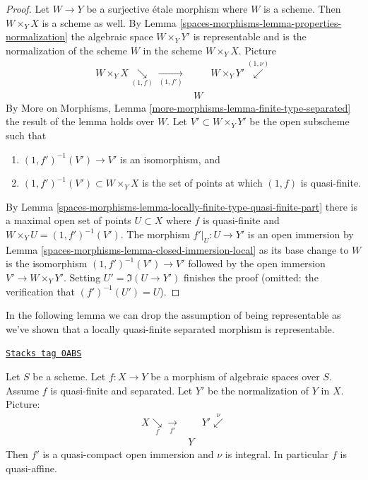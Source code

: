 \begin{proof}
Let $W \to Y$ be a surjective \'etale morphism where $W$ is a scheme.
Then $W \times_Y X$ is a scheme as well. By
Lemma \ref{spaces-morphisms-lemma-properties-normalization}
the algebraic space $W \times_Y Y'$ is representable and is
the normalization of the scheme $W$ in the scheme $W \times_Y X$. Picture
$$
\begin{array}{ccc}W \times_Y X \underset{(1, f)}{\searrow}\underset{(1, f')}{\longrightarrow} &  & W \times_Y Y' \overset{(1, \nu)}{\swarrow} \\  & W & \end{array}
$$
By More on Morphisms, Lemma \ref{more-morphisms-lemma-finite-type-separated}
the result of the lemma holds over $W$. Let $V' \subset W \times_Y Y'$
be the open subscheme such that
\begin{enumerate}
\item $(1, f')^{-1}(V') \to V'$ is an isomorphism, and
\item $(1, f')^{-1}(V') \subset W \times_Y X$ is the set of points at which
$(1, f)$ is quasi-finite.
\end{enumerate}
By Lemma \ref{spaces-morphisms-lemma-locally-finite-type-quasi-finite-part}
there is a maximal open set of points $U \subset X$ where $f$
is quasi-finite and $W \times_Y U = (1, f')^{-1}(V')$.
The morphism $f'|_U : U \to Y'$ is an open immersion
by Lemma \ref{spaces-morphisms-lemma-closed-immersion-local}
as its base change to $W$ is the isomorphism $(1, f')^{-1}(V') \to V'$
followed by the open immersion $V' \to W \times_Y Y'$.
Setting $U' = \Im(U \to Y')$ finishes the proof
(omitted: the verification that $(f')^{-1}(U') = U$).
\end{proof}

In the following lemma we can drop the assumption of being
representable as we've shown that a locally quasi-finite
separated morphism is representable.

\begin{lemma}
\label{spaces-morphisms-lemma-quasi-finite-separated-quasi-affine}
\href{https://stacks.math.columbia.edu/tag/0ABS}{\texttt{Stacks tag 0ABS}}

Let $S$ be a scheme.
Let $f : X \to Y$ be a morphism of algebraic spaces over $S$.
Assume $f$ is quasi-finite and separated.
Let $Y'$ be the normalization of $Y$ in $X$.
Picture:
$$
\begin{array}{ccc}X \underset{f}{\searrow}\underset{f'}{\longrightarrow} &  & Y' \overset{\nu}{\swarrow} \\  & Y & \end{array}
$$
Then $f'$ is a quasi-compact open immersion and $\nu$ is integral.
In particular $f$ is quasi-affine.
\end{lemma}

